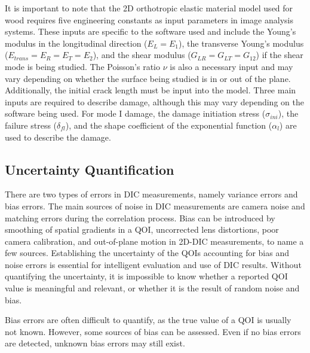It is important to note that the 2D orthotropic elastic material model used for wood requires five engineering constants as input parameters in image analysis systems. These inputs are specific to the software used and include the Young's modulus in the longitudinal direction ($E_L=E_1$), the transverse Young's modulus ($E_{trans}=E_R=E_T=E_2$), and the shear modulus ($G_{LR}=G_{LT}=G_{12}$) if the shear mode is being studied.
The Poisson's ratio $\nu$ is also a necessary input and may vary depending on whether the surface being studied is in or out of the plane. Additionally, the initial crack length must be input into the model.
Three main inputs are required to describe damage, although this may vary depending on the software being used. For mode I damage, the damage initiation stress ($\sigma_{ini}$), the failure stress ($\delta_{fl}$), and the shape coefficient of the exponential function ($\alpha_l$) are used to describe the damage.

\subsection{Uncertainty Quantification}

There are two types of errors in DIC measurements, namely variance errors and bias errors. The main sources of noise in DIC measurements are camera noise and matching errors during the correlation process. Bias can be introduced by smoothing of spatial gradients in a QOI, uncorrected lens distortions, poor camera calibration, and out-of-plane motion in 2D-DIC measurements, to name a few sources. Establishing the uncertainty of the QOIs accounting for bias and noise errors is essential for intelligent evaluation and use of DIC results. Without quantifying the uncertainty, it is impossible to know whether a reported QOI value is meaningful and relevant, or whether it is the result of random noise and bias.

Bias errors are often difficult to quantify, as the true value of a QOI is usually not known. However, some sources of bias can be assessed. Even if no bias errors are detected, unknown bias errors may still exist.

